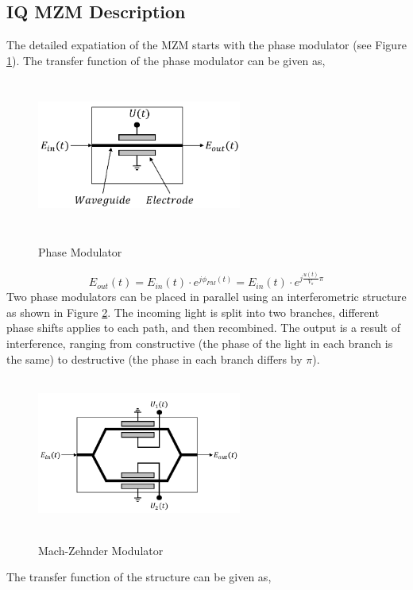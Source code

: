 \begin{refsection}
\subsection*{IQ MZM Description}
The detailed expatiation of the MZM starts with the phase modulator (see Figure \ref{Phase_Modulator}). The transfer function of the phase modulator can be given as,
\begin{figure}[h]
	\centering
	\includegraphics[width=0.6\textwidth, height=5cm]{./lib/iq_modulator/figures/PM.pdf}
	\label{Phase_Modulator}\caption{Phase Modulator}
\end{figure}
\begin{equation*}
E_{out}(t)=E_{in}(t)\cdot e^{j\phi_{PM}(t)} = E_{in}(t)\cdot e^{j\frac{u(t)}{V_{\pi}}\pi}
\label{PM_TF}
\end{equation*}
Two phase modulators can be placed in parallel using an interferometric structure as shown in Figure \ref{MZM}. The incoming light is split into two branches, different phase shifts applies to each path, and then recombined.
The output is a result of interference, ranging from constructive (the phase of the light in each branch is the same) to destructive (the phase in each branch differs by $\pi$). 
\begin{figure}[h]
	\centering
	\includegraphics[width=0.6\textwidth, height=5cm]{./lib/iq_modulator/figures/MZM.pdf}
	\label{MZM}\caption{Mach-Zehnder Modulator}
\end{figure}
The transfer function of the structure can be given as,
\begin{equation}

\end{equation}
\end{refsection}
